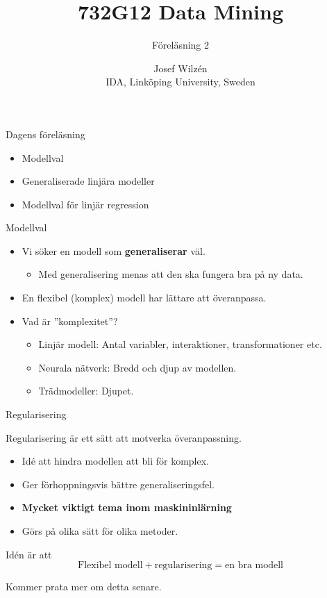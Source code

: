 \documentclass[10pt,english]{beamer}
\title{732G12 Data Mining}
\subtitle{Föreläsning 2}
\date{}
\author{Josef Wilzén \\ IDA, Linköping University, Sweden}
\begin{document}
\maketitle

\begin{frame}{Dagens föreläsning}
    
    \begin{itemize}
        \item Modellval
        \item Generaliserade linjära modeller
        \item Modellval för linjär regression
    \end{itemize}

\end{frame}

\begin{frame}{Modellval}
    
    \begin{itemize}
        \item Vi söker en modell som \textbf{generaliserar} väl.
        \begin{itemize}
            \item Med generalisering menas att den ska fungera bra på ny data.
        \end{itemize}
        \item En flexibel (komplex) modell har lättare att överanpassa.
        \item Vad är ''komplexitet''?
        \begin{itemize}
            \item Linjär modell: Antal variabler, interaktioner, transformationer etc.
            \item Neurala nätverk: Bredd och djup av modellen.
            \item Trädmodeller: Djupet.
        \end{itemize}
    \end{itemize}

\end{frame}

\begin{frame}{Regularisering}

    Regularisering är ett sätt att motverka överanpassning.

    \begin{itemize}
        \item Idé att hindra modellen att bli för komplex.
        \item Ger förhoppningsvis bättre generaliseringsfel.
        \item \textbf{Mycket viktigt tema inom maskininlärning}
        \item Görs på olika sätt för olika metoder.
    \end{itemize}

    Idén är att
    \begin{equation*}
        \text{Flexibel modell} + \text{regularisering} = \text{en bra modell}
    \end{equation*}

    Kommer prata mer om detta senare.

\end{frame}
\end{document}
